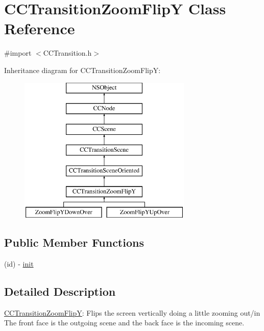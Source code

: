 \hypertarget{interface_c_c_transition_zoom_flip_y}{\section{C\-C\-Transition\-Zoom\-Flip\-Y Class Reference}
\label{interface_c_c_transition_zoom_flip_y}
}


{\ttfamily \#import $<$C\-C\-Transition.\-h$>$}

Inheritance diagram for C\-C\-Transition\-Zoom\-Flip\-Y\-:\begin{figure}[H]
\begin{center}
\leavevmode
\includegraphics[height=7.000000cm]{interface_c_c_transition_zoom_flip_y}
\end{center}
\end{figure}
\subsection*{Public Member Functions}
\begin{DoxyCompactItemize}
\item 
(id) -\/ \hyperlink{interface_c_c_transition_zoom_flip_y_a5ca9edd127622a0d25322dde9daf7447}{init}
\end{DoxyCompactItemize}


\subsection{Detailed Description}
\hyperlink{interface_c_c_transition_zoom_flip_y}{C\-C\-Transition\-Zoom\-Flip\-Y}\-: Flips the screen vertically doing a little zooming out/in The front face is the outgoing scene and the back face is the incoming scene. 

